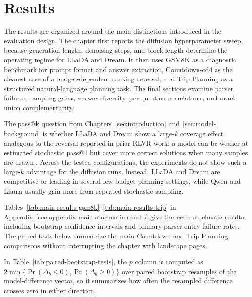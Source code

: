 \section{Results}
\label{sec:results}

The results are organized around the main distinctions introduced in the evaluation design. The chapter first reports the diffusion hyperparameter sweep, because generation length, denoising steps, and block length determine the operating regime for LLaDA and Dream. It then uses GSM8K as a diagnostic benchmark for prompt format and answer extraction, Countdown-cd4 as the clearest case of a budget-dependent ranking reversal, and Trip Planning as a structured natural-language planning task. The final sections examine parser failures, sampling gains, answer diversity, per-question correlations, and oracle-union complementarity.

The pass@k question from Chapters~\ref{sec:introduction} and~\ref{sec:model-background} is whether LLaDA and Dream show a large-$k$ coverage effect analogous to the reversal reported in prior RLVR work: a model can be weaker at estimated stochastic pass@1 but cover more correct solutions when many samples are drawn \cite{yue2025rlvr}. Across the tested configurations, the experiments do not show such a large-$k$ advantage for the diffusion runs. Instead, LLaDA and Dream are competitive or leading in several low-budget planning settings, while Qwen and Llama usually gain more from repeated stochastic sampling.

Tables~\ref{tab:main-results-gsm8k}--\ref{tab:main-results-trip} in Appendix~\ref{sec:appendix-main-stochastic-results} give the main stochastic results, including bootstrap confidence intervals and primary-parser-entry failure rates. The paired tests below summarize the main Countdown and Trip Planning comparisons without interrupting the chapter with landscape pages.


In Table~\ref{tab:paired-bootstrap-tests}, the $p$ column is computed as $2\min\{\Pr(\Delta_b \leq 0),\Pr(\Delta_b \geq 0)\}$ over paired bootstrap resamples of the model-difference vector, so it summarizes how often the resampled difference crosses zero in either direction.








